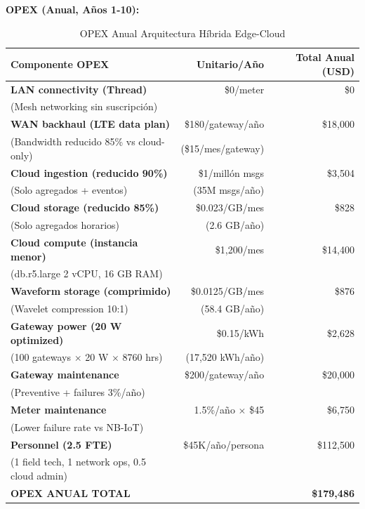 \textbf{OPEX (Anual, Años 1-10):}

\begin{table}[H]
\centering
\caption{OPEX Anual Arquitectura Híbrida Edge-Cloud}
\label{tab:opex-hybrid}
\small
\begin{tabular}{|p{5.5cm}|r|r|}
\hline
\rowcolor{purple!20}
\textbf{Componente OPEX} & \textbf{Unitario/Año} & \textbf{Total Anual (USD)} \\
\hline
\textbf{LAN connectivity (Thread)} & \$0/meter & \$0 \\
(Mesh networking sin suscripción) & & \\
\hline
\textbf{WAN backhaul (LTE data plan)} & \$180/gateway/año & \$18,000 \\
(Bandwidth reducido 85\% vs cloud-only) & (\$15/mes/gateway) & \\
\hline
\textbf{Cloud ingestion (reducido 90\%)} & \$1/millón msgs & \$3,504 \\
(Solo agregados + eventos) & (35M msgs/año) & \\
\hline
\textbf{Cloud storage (reducido 85\%)} & \$0.023/GB/mes & \$828 \\
(Solo agregados horarios) & (2.6 GB/año) & \\
\hline
\textbf{Cloud compute (instancia menor)} & \$1,200/mes & \$14,400 \\
(db.r5.large 2 vCPU, 16 GB RAM) & & \\
\hline
\textbf{Waveform storage (comprimido)} & \$0.0125/GB/mes & \$876 \\
(Wavelet compression 10:1) & (58.4 GB/año) & \\
\hline
\textbf{Gateway power (20 W optimized)} & \$0.15/kWh & \$2,628 \\
(100 gateways $\times$ 20 W $\times$ 8760 hrs) & (17,520 kWh/año) & \\
\hline
\textbf{Gateway maintenance} & \$200/gateway/año & \$20,000 \\
(Preventive + failures 3\%/año) & & \\
\hline
\textbf{Meter maintenance} & 1.5\%/año $\times$ \$45 & \$6,750 \\
(Lower failure rate vs NB-IoT) & & \\
\hline
\textbf{Personnel (2.5 FTE)} & \$45K/año/persona & \$112,500 \\
(1 field tech, 1 network ops, 0.5 cloud admin) & & \\
\hline
\rowcolor{gray!20}
\textbf{OPEX ANUAL TOTAL} & & \textbf{\$179,486} \\
\hline
\end{tabular}
\end{table}

